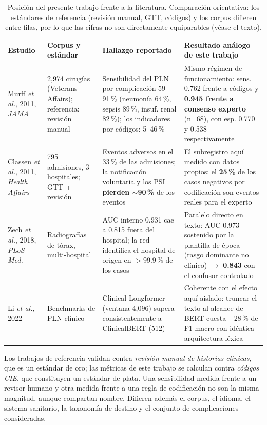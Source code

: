 \documentclass[conference]{IEEEtran}
\begin{document}
\begin{table}[!t]
\caption{Posición del presente trabajo frente a la literatura. Comparación
orientativa: los estándares de referencia (revisión manual, GTT, códigos) y
los corpus difieren entre filas, por lo que las cifras no son directamente
equiparables (véase el texto).}
\label{tab:literatura}
\centering
\footnotesize
\begin{tabular}{p{2.6cm}p{3.4cm}p{5.2cm}p{5.2cm}}
\hline
\textbf{Estudio} & \textbf{Corpus y estándar} & \textbf{Hallazgo reportado}
& \textbf{Resultado análogo de este trabajo} \\
\hline
Murff \emph{et al.}, 2011, \emph{JAMA} \cite{murff} &
2,974 cirugías (Veterans Affairs); referencia: revisión manual &
Sensibilidad del PLN por complicación 59--91\,\% (neumonía 64\,\%, sepsis
89\,\%, insuf. renal 82\,\%); los indicadores por códigos: 5--46\,\% &
Mismo régimen de funcionamiento: sens. 0.762 frente a códigos y
\textbf{0.945 frente a consenso experto} (n=68), con esp. 0.770 y 0.538
respectivamente \\
\hline
Classen \emph{et al.}, 2011, \emph{Health Affairs} \cite{classen} &
795 admisiones, 3 hospitales; GTT + revisión &
Eventos adversos en el 33\,\% de las admisiones; la notificación voluntaria
y los PSI \textbf{pierden $\sim$90\,\%} de los eventos &
El subregistro aquí medido con datos propios: el \textbf{25\,\%} de los
casos negativos por codificación son eventos reales para el experto \\
\hline
Zech \emph{et al.}, 2018, \emph{PLoS Med.} \cite{zech} &
Radiografías de tórax, multi-hospital &
AUC interno 0.931 cae a 0.815 fuera del hospital; la red identifica el
hospital de origen en $>$99.9\,\% de los casos &
Paralelo directo en texto: AUC 0.973 sostenido por la plantilla de época
(rasgo dominante no clínico) $\rightarrow$ \textbf{0.843} con el confusor
controlado \\
\hline
Li \emph{et al.}, 2022 \cite{cliniclong} &
Benchmarks de PLN clínico &
Clinical-Longformer (ventana 4,096) supera consistentemente a ClinicalBERT
(512) &
Coherente con el efecto aquí aislado: truncar el texto al alcance de BERT
cuesta $-$28\,\% de F1-macro con idéntica arquitectura léxica \\
\hline
\end{tabular}
\end{table}

Los trabajos de referencia validan contra \emph{revisión manual de historias
clínicas}, que es un estándar de oro; las métricas de este trabajo se calculan
contra \emph{códigos CIE}, que constituyen un estándar de plata. Una
sensibilidad medida frente a un revisor humano y otra medida frente a una
regla de codificación no son la misma magnitud, aunque compartan nombre.
Difieren además el corpus, el idioma, el sistema sanitario, la taxonomía de
destino y el conjunto de complicaciones consideradas.
\end{document}
